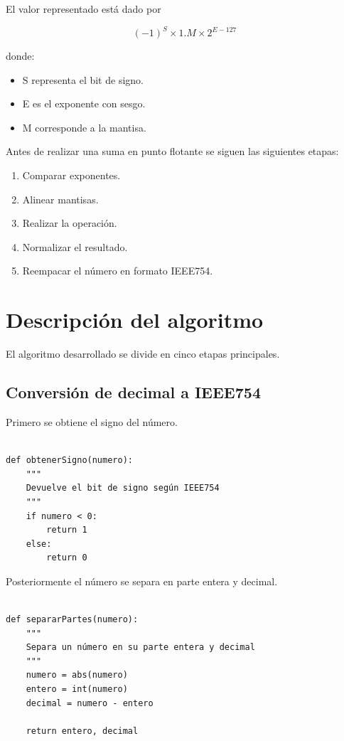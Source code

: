 \documentclass[11pt]{article}
\begin{document}
El valor representado está dado por

\[
(-1)^S \times 1.M \times 2^{E-127}
\]

donde:

\begin{itemize}
\item S representa el bit de signo.
\item E es el exponente con sesgo.
\item M corresponde a la mantisa.
\end{itemize}

Antes de realizar una suma en punto flotante se siguen las siguientes
etapas:

\begin{enumerate}
\item Comparar exponentes.
\item Alinear mantisas.
\item Realizar la operación.
\item Normalizar el resultado.
\item Reempacar el número en formato IEEE754.
\end{enumerate}
\section{Descripción del algoritmo}
\label{sec:orgf69d785}

El algoritmo desarrollado se divide en cinco etapas principales.
\subsection{Conversión de decimal a IEEE754}
\label{sec:org3a96961}

Primero se obtiene el signo del número.

\begin{verbatim}

def obtenerSigno(numero):
    """
    Devuelve el bit de signo según IEEE754
    """
    if numero < 0:
        return 1
    else:
        return 0

\end{verbatim}

Posteriormente el número se separa en parte entera y decimal.

\begin{verbatim}

def separarPartes(numero):
    """
    Separa un número en su parte entera y decimal
    """
    numero = abs(numero)
    entero = int(numero)
    decimal = numero - entero

    return entero, decimal

\end{verbatim}
\end{document}

